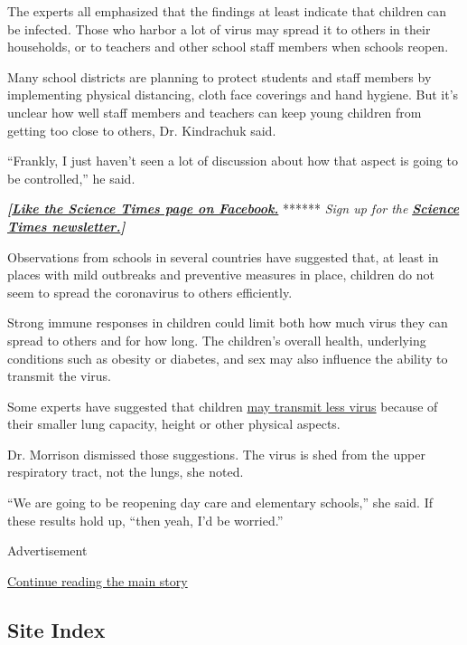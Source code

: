 The experts all emphasized that the findings at least indicate that
children can be infected. Those who harbor a lot of virus may spread it
to others in their households, or to teachers and other school staff
members when schools reopen.

Many school districts are planning to protect students and staff members
by implementing physical distancing, cloth face coverings and hand
hygiene. But it's unclear how well staff members and teachers can keep
young children from getting too close to others, Dr. Kindrachuk said.

``Frankly, I just haven't seen a lot of discussion about how that aspect
is going to be controlled,'' he said.

\textbf{\emph{{[}}\href{http://on.fb.me/1paTQ1h}{\emph{Like the Science
Times page on Facebook.}}} ****** \emph{\textbar{} Sign up for the}
\textbf{\href{http://nyti.ms/1MbHaRU}{\emph{Science Times
newsletter.}}\emph{{]}}}

Observations from schools in several countries have suggested that, at
least in places with mild outbreaks and preventive measures in place,
children do not seem to spread the coronavirus to others efficiently.

Strong immune responses in children could limit both how much virus they
can spread to others and for how long. The children's overall health,
underlying conditions such as obesity or diabetes, and sex may also
influence the ability to transmit the virus.

Some experts have suggested that children
\href{https://www.nytimes.com/2020/06/30/us/coronavirus-schools-reopening-guidelines-aap.html}{may
transmit less virus} because of their smaller lung capacity, height or
other physical aspects.

Dr. Morrison dismissed those suggestions. The virus is shed from the
upper respiratory tract, not the lungs, she noted.

``We are going to be reopening day care and elementary schools,'' she
said. If these results hold up, ``then yeah, I'd be worried.''

Advertisement

\protect\hyperlink{after-bottom}{Continue reading the main story}

\hypertarget{site-index}{%
\subsection{Site Index}\label{site-index}}

